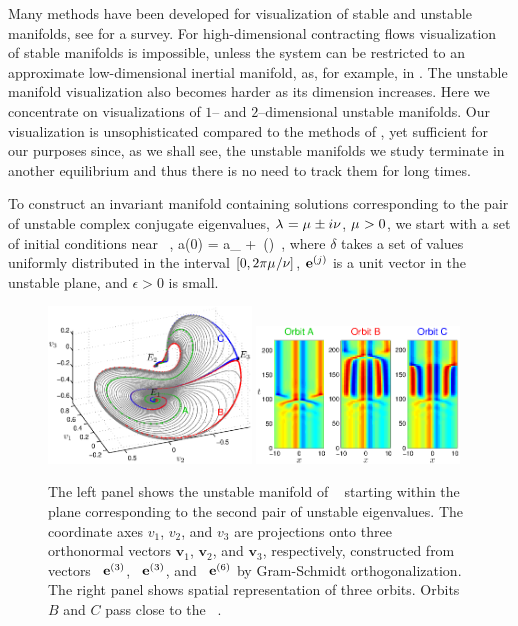 Many methods have been developed for visualization of stable
and unstable manifolds, see 
for a survey. For high-dimensional contracting flows
visualization of stable manifolds is impossible, unless the
system can be restricted to an approximate  low-dimensional
inertial manifold, as, for example, in . The unstable
manifold visualization also becomes harder as its dimension
increases. Here we concentrate on visualizations of $1$-- and
$2$--dimensional unstable manifolds. Our visualization is
unsophisticated compared to the methods of
, yet sufficient for our
purposes since, as we shall see, the unstable manifolds we
study terminate in another equilibrium and thus there is no
need to track them for long times.


To construct an invariant manifold containing solutions
corresponding to the pair of unstable complex conjugate eigenvalues,
$\lambda_{ } = \mu_{ } \pm i\nu_{ }$,
$\mu_{ } > 0$, we start with a set of
initial conditions near \eqv\ ,
\beq
  a(0) = a_{{}} + \epsilon\,\exp(\delta)
\,,
where $\delta$ takes a set of values uniformly distributed in the
interval $[0,2\pi\mu_{ }/\nu_{ }]$, ${\mathbf e}^{(j)}$ is a unit vector in the
unstable plane, and $\epsilon > 0$ is small.

\begin{figure}[t]
\begin{center}
\includegraphics[width=0.48\textwidth, clip=true]{figs/ks22_E1_plane2_manifold_c.eps}
\includegraphics[width=0.48\textwidth, clip=true]{figs/ks22_E1_plane2_orbits_c.eps}
\end{center}
\caption{
The left panel shows the unstable
manifold of \eqv\  starting within the plane
corresponding to the second pair of unstable eigenvalues. The
coordinate axes $v_1$, $v_2$, and $v_3$ are
projections onto three orthonormal vectors
$\mathbf{v}_1$, $\mathbf{v}_2$, and $\mathbf{v}_3$,
respectively, constructed from vectors
\Re\, ${\mathbf e}^{(3)}$, \Im\, ${\mathbf e}^{(3)}$, and \Re\, ${\mathbf e}^{(6)}$
by Gram-Schmidt orthogonalization.
The right panel shows spatial representation of three orbits. Orbits
$B$ and $C$ pass close to the \eqv\ .
   }
\label{f:KS22E1man2}
\end{figure}

